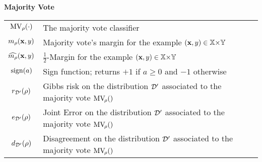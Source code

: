 \centerline{\bf Majority Vote}
\vspace{0.2cm}
\begin{tabular}{cp{13cm}}
$\text{MV}_{\rho}(\cdot)$ & The majority vote classifier\\
$m_{\rho}(\mathbf{x},y)$ & Majority vote's margin for the example $(\mathbf{x},y)\in\mathbb{X}{\times}\mathbb{Y}$\\
$\widehat{m_{\rho}}(\mathbf{x},y)$ & $\frac{1}{2}$-Margin for the example $(\mathbf{x},y)\in\mathbb{X}{\times}\mathbb{Y}$\\
$\operatorname{sign}(a)$ & Sign function; returns ${+}1$ if $a\ge0$ and ${-}1$ otherwise\\
$r_{\mathcal{D}'}(\rho)$ & Gibbs risk on the distribution $\mathcal{D}'$ associated to the majority vote $\text{MV}_{\!\rho}()$\\
$e_{\mathcal{D}'}(\rho)$ & Joint Error on the distribution $\mathcal{D}'$ associated to the majority vote $\text{MV}_{\!\rho}()$\\
$d_{\mathcal{D}'}(\rho)$ & Disagreement on the distribution $\mathcal{D}'$ associated to the majority vote $\text{MV}_{\!\rho}()$\\
\end{tabular}